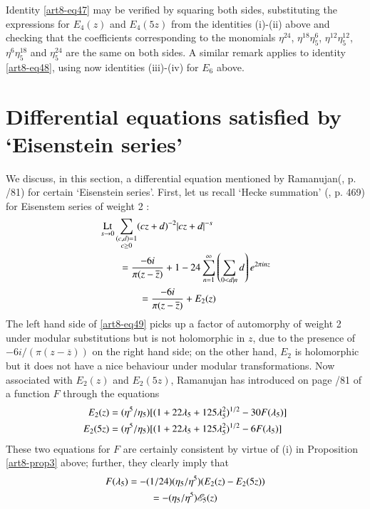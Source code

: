 Identity \eqref{art8-eq47} may be verified by squaring both sides, substituting the expressions for $E_{4}(z)$ and $E_{4}(5z)$ from the identities (i)-(ii) above and checking that the coefficients corresponding to the monomials $\eta^{24}$, $\eta^{18}\eta^{6}_{5}$, $\eta^{12}\eta^{12}_{5}$, $\eta^{6}\eta^{18}_{5}$ and $\eta^{24}_{5}$ are the same on both sides. A similar remark applies to identity \eqref{art8-eq48}, using now identities (iii)-(iv) for $E_{6}$ above.

\section{Differential equations satisfied by `Eisenstein series'}\label{art8-sec5}
We discuss, in this section, a differential equation mentioned by Ramanujan\pageoriginale (\cite{art8-key11}, p. /81) for certain `Eisenstein series'. First, let us recall `Hecke summation' (\cite{art8-key5}, p. 469) for Eisenstem series of weight 2 :
\begin{align}
&\operatorname*{Lt}\limits_{s\to 0}\sum\limits_{\substack{(c,d)=1\\ c\geq 0}}(cz+d)^{-2}|cz+d|^{-s}\notag\\
&\qquad =\frac{-6i}{\pi(z-\overline{z})}+1-24\sum\limits^{\infty}_{n=1}\left(\sum\limits_{0<d|n}d\right)e^{2\pi inz}\notag\\
&\qquad\qquad =\dfrac{-6i}{\pi(z-\overline{z})}+E_{2}(z)\label{art8-eq49}
\end{align}
The left hand side of \eqref{art8-eq49} picks up a factor of automorphy of weight 2 under modular substitutions but is not holomorphic in $z$, due to the presence of $-6i/(\pi(z-\overline{z}))$ on the right hand side; on the other hand, $E_{2}$ is holomorphic but it does not have a nice behaviour under modular transformations. Now associated with $E_{2}(z)$ and $E_{2}(5z)$, Ramanujan has introduced on page /81 of \cite{art8-key11} a function $F$ through the equations
\begin{align}
E_{2}(z) &= (\eta^{5}/\eta_{5})[(1+22\lambda_{5}+125\lambda^{2}_{5})^{1/2}-30F(\lambda_{5})]\notag\\
E_{2}(5z) &= (\eta^{5}/\eta_{5})[(1+22\lambda_{5}+125\lambda^{2}_{5})^{1/2}-6F(\lambda_{5})]\label{art8-eq50}
\end{align}
These two equations for $F$ are certainly consistent by virtue of (i) in Proposition \ref{art8-prop3} above; further, they clearly imply that
\begin{gather}
F(\lambda_{5})=-(1/24)(\eta_{5}/\eta^{5})(E_{2}(z)-E_{2}(5z))\notag\\
=-(\eta_{5}/\eta^{5})\mathscr{E}_{5}(z)\label{art8-eq51}
\end{gather}
